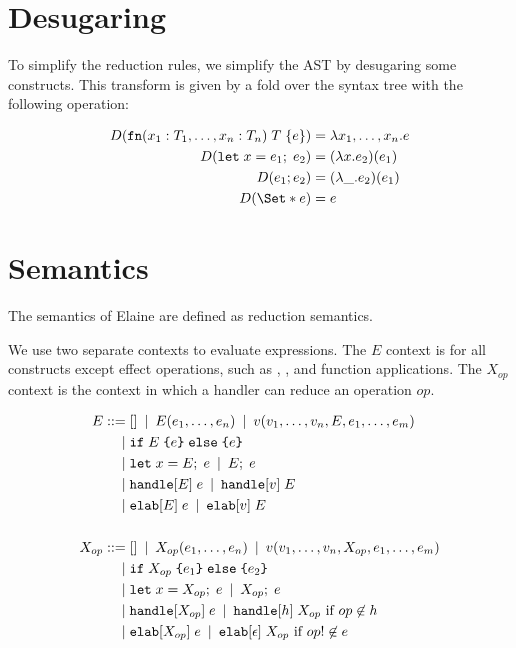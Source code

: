 \section{Desugaring}
To simplify the reduction rules, we simplify the AST by desugaring some constructs. This transform is given by a fold over the syntax tree with the following operation:

\begin{align*}
    D(\fn(x_1: T_1, \dots, x_n: T_n)\;T\;\{e\}) &= \lambda x_1,\dots,x_n . e \\
    D(\kw{let}\;x = e_1;\;e_2) &= (\lambda x . e_2)(e_1)\\
    D(e_1; e_2) &= (\lambda \_ . e_2)(e_1)\\
    D(\S{e}) &= e\\
\end{align*}

\section{Semantics}\label{sec:semantics}

The semantics of Elaine are defined as reduction semantics.

We use two separate contexts to evaluate expressions. The $E$ context is for all constructs except effect operations, such as , , and function applications. The $X_{op}$ context is the context in which a handler can reduce an operation $op$.

\begin{align*}
    E
        \mathbin{\;::=\;} & [] \mathbin{\;|\;} E(e_1,\dots, e_n) \mathbin{\;|\;} v(v_1,\dots,v_n,E,e_1,\dots,e_m) \\
        \mathbin{\;|\;} & \text{\texttt{if}}\;E\;\text{\texttt{\{}}e\text{\texttt{\}}}\;\text{\texttt{else}}\;\text{\texttt{\{}}e\text{\texttt{\}}}\; \\
        \mathbin{\;|\;} & \text{\texttt{let}}\;x = E;\;e \mathbin{\;|\;} E;\;e\\
        \mathbin{\;|\;} & \text{\texttt{handle}}[E]\;e \mathbin{\;|\;} \text{\texttt{handle}}[v]\;E \\
        \mathbin{\;|\;} & \text{\texttt{elab}}[E]\;e \mathbin{\;|\;} \text{\texttt{elab}}[v]\;E\\
    \\
    X_{op}
        \mathbin{\;::=\;} & [] \mathbin{\;|\;} X_{op}(e_1, \dots, e_n) \mathbin{\;|\;} v(v_1, \dots, v_n, X_{op}, e_1, \dots, e_m) \\
        \mathbin{\;|\;} & \text{\texttt{if}}\;X_{op}\;\text{\texttt{\{}}e_1\text{\texttt{\}}}\;\text{\texttt{else}}\;\text{\texttt{\{}}e_2\text{\texttt{\}}}\; \\
        \mathbin{\;|\;} & \text{\texttt{let}}\;x = X_{op};\;e \mathbin{\;|\;} X_{op};\;e \\
        \mathbin{\;|\;} & \text{\texttt{handle}}[X_{op}]\;e \mathbin{\;|\;} \text{\texttt{handle}}[h]\;{X_{op}} \text{ if } op\not\in h \\
        \mathbin{\;|\;} & \text{\texttt{elab}}[X_{op}]\;e \mathbin{\;|\;} \text{\texttt{elab}}[\epsilon]\;X_{op} \text{ if } op! \not\in e
\end{align*}

